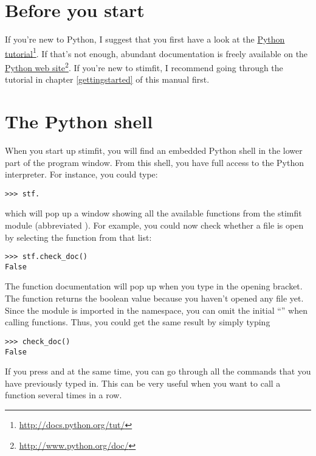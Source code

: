 \label{pythonshell}
\section{Before you start}
If you're new to Python, I suggest that you first have a look at the \href{http://docs.python.org/tut/}{Python tutorial}\footnote{\url{http://docs.python.org/tut/}}. If that's not enough, abundant documentation is freely available on the \href{http://www.python.org/doc/}{Python web site}\footnote{\url{http://www.python.org/doc/}}. If you're new to stimfit, I recommend going through the tutorial in chapter \ref{gettingstarted} of this manual first.

\section{The Python shell}
When you start up stimfit, you will find an embedded Python shell in the lower part of the program window. From this shell, you have full access to the Python interpreter. For instance, you could type:
\begin{lstlisting}
>>> stf.
\end{lstlisting}
which will pop up a window showing all the available functions from the stimfit module (abbreviated ). For example, you could now check whether a file is open by selecting the   function from that list: 
\begin{lstlisting}
>>> stf.check_doc()
False
\end{lstlisting} The function documentation will pop up when you type in the opening bracket. The function returns the boolean value  because you haven't opened any file yet. Since the  module is imported in the namespace, you can omit the initial ``'' when calling functions. Thus, you could get the same result by simply typing
\begin{lstlisting}
>>> check_doc()
False
\end{lstlisting}
If you press  and \keybox{$\uparrow$} at the same time, you can go through all the commands that you have previously typed in. This can be very useful when you want to call a function several times in a row.

